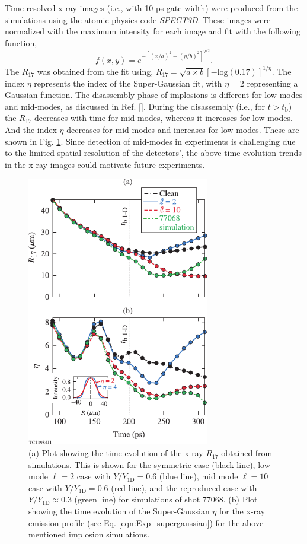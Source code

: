\documentclass[aip,reprint]{revtex4-1}
\begin{document}
 Time resolved x-ray images (i.e., with 10 ps gate width) were produced from the simulations using the atomic physics code \textit{SPECT3D}. These images were normalized with the maximum intensity for each image and fit with the following function,
%
\begin{equation}
\label{eqn:Exp_supergaussian}
f(x,y) = e^{-\left[ (x/a)^2 + (y/b)^2 \right]^{\eta/2}}.
\end{equation}
%
 The $R_{17}$ was obtained from the fit using, $R_{17} = \sqrt{a\times b} [-\text{log}(0.17)]^{1/\eta}$. The index $\eta$ represents the index of the Super-Gaussian fit, with $\eta=2$ representing a Gaussian function. The disassembly phase of implosions is different for low-modes and mid-modes, as discussed in Ref. []. During the disassembly (i.e., for $t > t_\text{b}$) the $R_{17}$ decreases with time for mid modes, whereas it increases for low modes. And the index $\eta$ decreases for mid-modes and increases for low modes. These are shown in Fig. \ref{fig:Exp_volumeVstime}. Since detection of mid-modes in experiments is challenging due to the limited spatial resolution of the detectors', the above time evolution trends in the x-ray images could motivate future experiments.
%
%
%
\begin{figure}
\includegraphics[width=80mm]{Fig9_Bose}
\caption{\label{fig:Exp_volumeVstime} (a) Plot showing the time evolution of the x-ray $R_{17}$ obtained from simulations. This is shown for the symmetric case (black line), low mode $\ell=2$ case with $Y/Y_\text{1D}=0.6$ (blue line), mid mode $\ell=10$ case with $Y/Y_\text{1D}=0.6$ (red line), and the reproduced case with $Y/Y_\text{1D}\approx 0.3$ (green line) for simulations of shot 77068. (b) Plot showing the time evolution of the Super-Gaussian $\eta$ for the x-ray emission profile (see Eq. \ref{eqn:Exp_supergaussian}) for the above mentioned implosion simulations.}
\end{figure}
\end{document}
